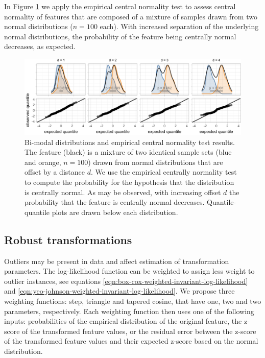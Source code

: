 \documentclass[
  a4paper,
]{article}
\begin{document}
In Figure \ref{fig:empirical-central-normality-examples} we apply the
empirical central normality test to assess central normality of features
that are composed of a mixture of samples drawn from two normal
distributions (\(n = 100\) each). With increased separation of the
underlying normal distributions, the probability of the feature being
centrally normal decreases, as expected.

\begin{figure}

{\centering \includegraphics{manuscript_files/figure-latex/empirical-central-normality-examples-1} 

}

\caption{Bi-modal distributions and empirical central normality test results. The feature (black) is a mixture of two identical sample sets (blue and orange, $n = 100$) drawn from normal distributions that are offset by a distance $d$. We use the empirical centrally normality test to compute the probability for the hypothesis that the distribution is centrally normal. As may be observed, with increasing offset $d$ the probability that the feature is centrally normal decreases. Quantile-quantile plots are drawn below each distribution.}\label{fig:empirical-central-normality-examples}
\end{figure}

\subsection{Robust transformations}\label{robust-transformations}

Outliers may be present in data and affect estimation of transformation
parameters. The log-likelihood function can be weighted to assign less
weight to outlier instances, see equations
\ref{eqn:box-cox-weighted-invariant-log-likelihood} and
\ref{eqn:yeo-johnson-weighted-invariant-log-likelihood}. We propose
three weighting functions: step, triangle and tapered cosine, that have
one, two and two parameters, respectively. Each weighting function then
uses one of the following inputs: probabilities of the empirical
distribution of the original feature, the z-score of the transformed
feature values, or the residual error between the z-score of the
transformed feature values and their expected z-score based on the
normal distribution.
\end{document}
